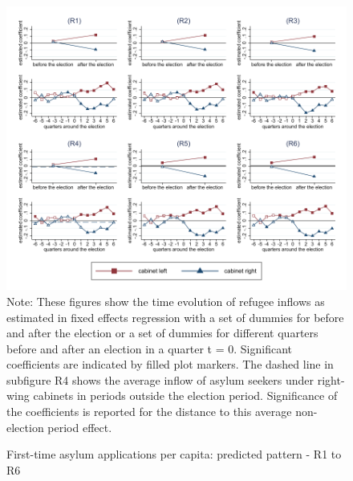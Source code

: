 \documentclass[11pt,a4paper]{scrartcl}
\begin{document}
\clearpage
\FloatBarrier




\clearpage
\FloatBarrier
\begin{figure}[!ht]
	\caption{First-time asylum applications per capita: predicted pattern - R1 to R6}
	\includegraphics[width=1\textwidth]{../results/applications/app_graphs_R1-R6.pdf}
	\scriptsize{Note: These figures show the time evolution of refugee inflows as estimated in fixed effects regression
		with a set of dummies for before and after the election or a set of dummies for different quarters before and after an election in a quarter t = 0. Significant coefficients are indicated by filled plot markers. The dashed line in subfigure R4 shows the average inflow of asylum seekers under right-wing cabinets in periods outside the election period. Significance of the coefficients is reported for the distance to this average non-election period effect.}
\end{figure}

\clearpage
\FloatBarrier



\clearpage
\FloatBarrier


\clearpage
\FloatBarrier


\end{document}
